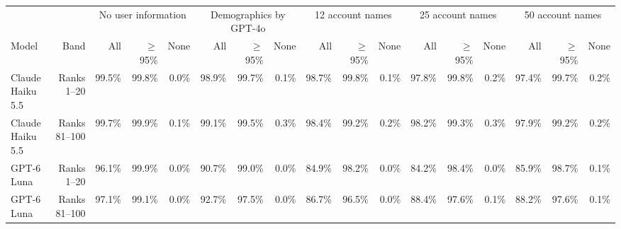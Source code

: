 \begin{tabular}{lrrrrrrrrrrrrrrrr}
\toprule
 &  & \multicolumn{3}{c}{No user information} & \multicolumn{3}{c}{Demographics by GPT-4o} & \multicolumn{3}{c}{12 account names} & \multicolumn{3}{c}{25 account names} & \multicolumn{3}{c}{50 account names} \\
Model & Band & All & $\geq$ 95\% & None & All & $\geq$ 95\% & None & All & $\geq$ 95\% & None & All & $\geq$ 95\% & None & All & $\geq$ 95\% & None \\
\midrule
Claude Haiku 5.5 & Ranks 1--20 & 99.5\% & 99.8\% & 0.0\% & 98.9\% & 99.7\% & 0.1\% & 98.7\% & 99.8\% & 0.1\% & 97.8\% & 99.8\% & 0.2\% & 97.4\% & 99.7\% & 0.2\% \\
Claude Haiku 5.5 & Ranks 81--100 & 99.7\% & 99.9\% & 0.1\% & 99.1\% & 99.5\% & 0.3\% & 98.4\% & 99.2\% & 0.2\% & 98.2\% & 99.3\% & 0.3\% & 97.9\% & 99.2\% & 0.2\% \\
GPT-6 Luna & Ranks 1--20 & 96.1\% & 99.9\% & 0.0\% & 90.7\% & 99.0\% & 0.0\% & 84.9\% & 98.2\% & 0.0\% & 84.2\% & 98.4\% & 0.0\% & 85.9\% & 98.7\% & 0.1\% \\
GPT-6 Luna & Ranks 81--100 & 97.1\% & 99.1\% & 0.0\% & 92.7\% & 97.5\% & 0.0\% & 86.7\% & 96.5\% & 0.0\% & 88.4\% & 97.6\% & 0.1\% & 88.2\% & 97.6\% & 0.1\% \\
\bottomrule
\end{tabular}
